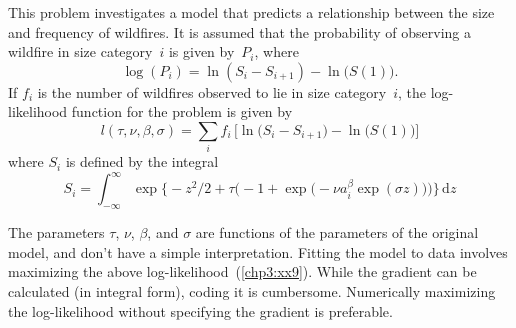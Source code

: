 \documentclass{admbmanual}
\begin{document}
This problem investigates a model that predicts a relationship between the size
and frequency of wildfires. It is assumed that the probability of observing a
wildfire in size category~$i$ is given by~$P_i$, where
\begin{equation*}
  \log(P_i)=\ln\left(S_i-S_{i+1}\right)-\ln\big(S(1)\big).
\end{equation*}
If $f_i$ is the number of wildfires observed to lie in size category~$i$, the
log-likelihood function for the problem is given by
\begin{equation}
  {
l(\tau,\nu,\beta,\sigma) =
   \sum_i f_i\,\Big[\ln\big(S_i-S_{i+1}\big)-\ln\big(S(1)\big)\Big]}
\label{chp3:xx9}
\end{equation}
where $S_i$ is defined by the integral
\begin{equation}
{
  S_i=\int_{-\infty}^\infty
  \exp\Big\{-z^2/2 +
  \tau\Big(-1+\exp\big(-\nu a_i^\beta\exp(\sigma z)\big)\Big) \Big\}
  \,\textrm{d}z}
\label{chp3:xx10}
\end{equation}

The parameters $\tau$, $\nu$, $\beta$, and $\sigma$ are functions of the
parameters of the original model, and don't have a simple interpretation.
Fitting the model to data involves maximizing the above
log-likelihood~(\ref{chp3:xx9}). %
While the gradient can be calculated (in integral form), coding it is
cumbersome. Numerically maximizing the log-likelihood without specifying the
gradient is preferable.
\end{document}

